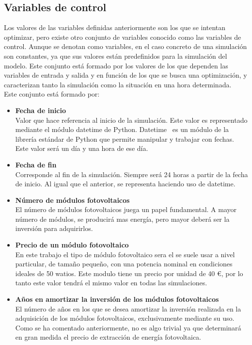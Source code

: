 \subsection{Variables de control}
Los valores de las variables definidas anteriormente son los que se intentan optimizar, pero existe otro conjunto de variables conocido como las variables de control. Aunque se denotan como variables, en el caso concreto de una simulación son constantes, ya que sus valores están predefinidos para la simulación del modelo. Este conjunto está formado por los valores de los que dependen las variables de entrada y salida y en función de los que se busca una optimización, y caracterizan tanto la simulación como la situación en una hora determinada.\\
Este conjunto está formado por:
\begin{itemize}
	\item \textbf{Fecha de inicio}\\ Valor que hace referencia al inicio de la simulación. Este valor es representado mediante el módulo datetime de Python. Datetime~\cite{Dtpy} es un módulo de la librería estándar de Python que permite manipular y trabajar con fechas. Este valor será un día y una hora de ese día.
	\item \textbf{Fecha de fin}\\ Corresponde al fin de la simulación. Siempre será 24 horas a partir de la fecha de inicio. Al igual que el anterior, se representa haciendo uso de datetime.
	\item \textbf{Número de módulos fotovoltaicos}\\ El número de módulos fotovoltaicos juega un papel fundamental. A mayor número de módulos, se producirá mas energía, pero mayor deberá ser la inversión para adquirirlos.
	\item \textbf{Precio de un módulo fotovoltaico}\\ En este trabajo el tipo de módulo fotovoltaico sera el se suele usar a nivel particular, de tamaño pequeño, con una potencia nominal en condiciones ideales de 50 watios. Este modulo tiene un precio por unidad de 40 €, por lo tanto este valor tendrá el mismo valor en todas las simulaciones.
	\item \textbf{Años en amortizar la inversión de los módulos fotovoltaicos}\\ El número de años en los que se desea amortizar la inversión realizada en la adquisición de los módulos fotovoltaicos, exclusivamente mediante su uso. Como se ha comentado anteriormente, no es algo trivial ya que determinará en gran medida el precio de extracción de energía fotovoltaica.

\end{itemize}
